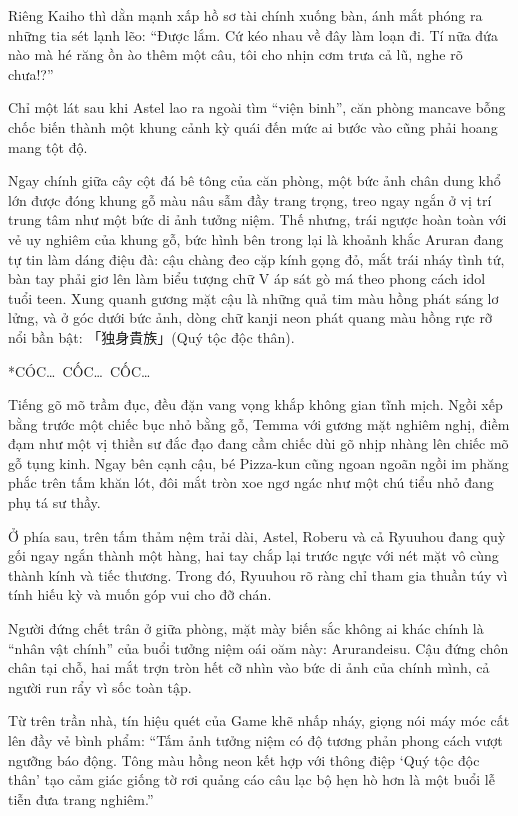 \documentclass[../main.tex]{subfiles}
\begin{document}
Riêng Kaiho thì dằn mạnh xấp hồ sơ tài chính xuống bàn, ánh mắt phóng ra những tia sét lạnh lẽo: ``Được lắm. Cứ kéo nhau về đây làm loạn đi. Tí nữa đứa nào mà hé răng ồn ào thêm một câu, tôi cho nhịn cơm trưa cả lũ, nghe rõ chưa!?''

\ct

Chỉ một lát sau khi Astel lao ra ngoài tìm ``viện binh'', căn phòng mancave bỗng chốc biến thành một khung cảnh kỳ quái đến mức ai bước vào cũng phải hoang mang tột độ.

Ngay chính giữa cây cột đá bê tông của căn phòng, một bức ảnh chân dung khổ lớn được đóng khung gỗ màu nâu sẫm đầy trang trọng, treo ngay ngắn ở vị trí trung tâm như một bức di ảnh tưởng niệm. Thế nhưng, trái ngược hoàn toàn với vẻ uy nghiêm của khung gỗ, bức hình bên trong lại là khoảnh khắc Aruran đang tự tin làm dáng điệu đà: cậu chàng đeo cặp kính gọng đỏ, mắt trái nháy tình tứ, bàn tay phải giơ lên làm biểu tượng chữ V áp sát gò má theo phong cách idol tuổi teen. Xung quanh gương mặt cậu là những quả tim màu hồng phát sáng lơ lửng, và ở góc dưới bức ảnh, dòng chữ kanji neon phát quang màu hồng rực rỡ nổi bần bật: 「独身貴族」(Quý tộc độc thân).


*CÓC\dots\ CỐC\dots\ CỐC\dots*

Tiếng gõ mõ trầm đục, đều đặn vang vọng khắp không gian tĩnh mịch. Ngồi xếp bằng trước một chiếc bục nhỏ bằng gỗ, Temma với gương mặt nghiêm nghị, điềm đạm như một vị thiền sư đắc đạo đang cầm chiếc dùi gõ nhịp nhàng lên chiếc mõ gỗ tụng kinh. Ngay bên cạnh cậu, bé Pizza-kun cũng ngoan ngoãn ngồi im phăng phắc trên tấm khăn lót, đôi mắt tròn xoe ngơ ngác như một chú tiểu nhỏ đang phụ tá sư thầy.

Ở phía sau, trên tấm thảm nệm trải dài, Astel, Roberu và cả Ryuuhou đang quỳ gối ngay ngắn thành một hàng, hai tay chắp lại trước ngực với nét mặt vô cùng thành kính và tiếc thương. Trong đó, Ryuuhou rõ ràng chỉ tham gia thuần túy vì tính hiếu kỳ và muốn góp vui cho đỡ chán.

Người đứng chết trân ở giữa phòng, mặt mày biến sắc không ai khác chính là ``nhân vật chính'' của buổi tưởng niệm oái oăm này: Arurandeisu. Cậu đứng chôn chân tại chỗ, hai mắt trợn tròn hết cỡ nhìn vào bức di ảnh của chính mình, cả người run rẩy vì sốc toàn tập.


Từ trên trần nhà, tín hiệu quét của Game khẽ nhấp nháy, giọng nói máy móc cất lên đầy vẻ bình phẩm: ``Tấm ảnh tưởng niệm có độ tương phản phong cách vượt ngưỡng báo động. Tông màu hồng neon kết hợp với thông điệp `Quý tộc độc thân' tạo cảm giác giống tờ rơi quảng cáo câu lạc bộ hẹn hò hơn là một buổi lễ tiễn đưa trang nghiêm.''
\end{document}
